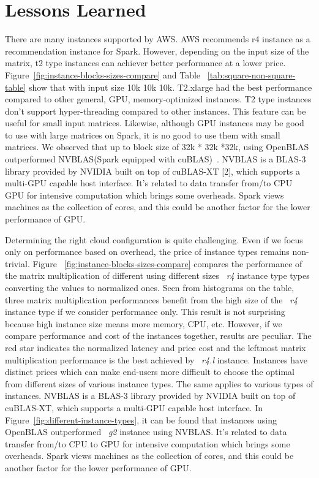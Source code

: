 \documentclass[10pt, conference, compsocconf]{IEEEtran}
\begin{document}
\section{Lessons Learned}
There are many instances supported by AWS. AWS recommends r4 instance as a recommendation instance for Spark. However, depending on the input size of the matrix, t2 type instances can achiever better performance at a lower price. Figure~\ref{fig:instance-blocks-sizes-compare} and Table ~\ref{tab:square-non-square-table} show that with input size 10k 10k 10k. T2.xlarge had the best performance compared to other general, GPU, memory-optimized instances. T2 type instances don't support hyper-threading compared to other instances. This feature can be useful for small input matrices. Likewise, although GPU instances may be good to use with large matrices on Spark, it is no good to use them with small matrices. We observed that up to block size of 32k * 32k *32k, using OpenBLAS outperformed NVBLAS(Spark equipped with cuBLAS)~\cite{nvidia2008cublas}. NVBLAS is a BLAS-3
library provided by NVIDIA built on top of cuBLAS-XT [2],
which supports a multi-GPU capable host interface. It's related to data transfer from/to CPU GPU for intensive computation which brings some overheads. Spark views machines as the collection of cores, and this could be another factor for the lower performance of GPU. 

Determining the right cloud configuration is quite challenging. Even if we focus only on performance based on overhead, the price of instance types remains non-trivial. Figure ~\ref{fig:instance-blocks-sizes-compare} compares the performance of the matrix multiplication of different using different sizes ~\textit{r4} instance type types converting the values to normalized ones. Seen from histograms on the table, three matrix multiplication performances benefit from the high size of the ~\textit{r4} instance type if we consider performance only. This result is not surprising because high instance size means more memory, CPU, etc. However, if we compare performance and cost of the instances together, results are peculiar. The red star indicates the normalized latency and price cost and the leftmost matrix multiplication performance is the best achieved by ~\textit{r4.l} instance. Instances have distinct prices which can make end-users more difficult to choose the optimal from different sizes of various instance types. The same applies to various types of instances. NVBLAS is a BLAS-3 library provided by NVIDIA built on top of cuBLAS-XT, which supports a multi-GPU capable host interface. In Figure~\ref{fig:different-instance-types}, it can be found that instances using OpenBLAS outperformed ~\textit{g2} instance using NVBLAS.  It's related to data transfer from/to CPU to GPU for intensive computation which brings some overheads. Spark views machines as the collection of cores, and this could be another factor for the lower performance of GPU.  
\end{document}
